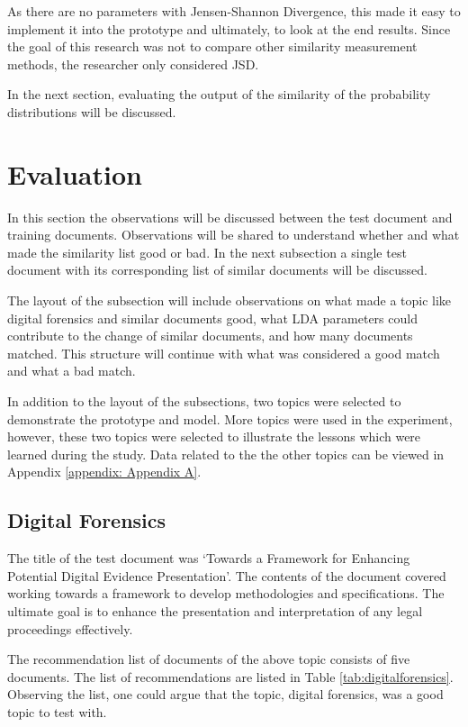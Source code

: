 As there are no parameters with Jensen-Shannon Divergence, this made it easy to implement it into the prototype and ultimately, to look at the end results. Since the goal of this research was not to compare other similarity measurement methods, the researcher only considered JSD.

In the next section, evaluating the output of the similarity of the probability distributions will be discussed.

\section{Evaluation} \label{ssec:eval}

In this section the observations will be discussed between the test document and training documents. Observations will be shared to understand whether and what made the similarity list good or bad. In the next subsection a single test document with its corresponding list of similar documents will be discussed. 

The layout of the subsection will include observations on what made a topic like digital forensics and similar documents good, what LDA parameters could contribute to the change of similar documents, and how many documents matched. This structure will continue with what was considered a good match and what a bad match.

In addition to the layout of the subsections, two topics were selected to demonstrate the prototype and model. More topics were used in the experiment, however, these two topics were selected to illustrate the lessons which were learned during the study. Data related to the the other topics can be viewed in Appendix \ref{appendix: Appendix A}.

\subsection{Digital Forensics}

The title of the test document was ‘Towards a Framework for Enhancing Potential Digital Evidence Presentation’. The contents of the document covered working towards a framework to develop methodologies and specifications. The ultimate goal is to enhance the presentation and interpretation of any legal proceedings effectively.

The recommendation list of documents of the above topic consists of five documents. The list of recommendations are listed in Table \ref{tab:digitalforensics}. Observing the list, one could argue that the topic, digital forensics, was a good topic to test with.

